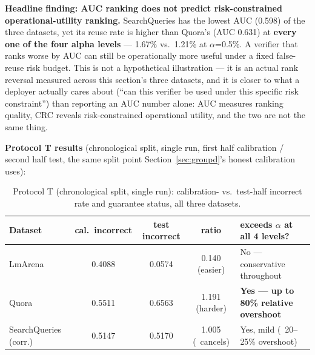 \documentclass[11pt]{article}
\newenvironment{fittab}{\begin{lrbox}{\fittabbox}}{\end{lrbox}%
  \ifdim\wd\fittabbox>\linewidth\resizebox{\linewidth}{!}{\usebox{\fittabbox}}\else\usebox{\fittabbox}\fi}
\begin{document}
\textbf{Headline finding: AUC ranking does not predict risk-constrained operational-utility ranking.} SearchQueries has the lowest AUC (0.598) of the three datasets, yet its reuse rate is higher than Quora's (AUC 0.631) at \textbf{every one of the four alpha levels} --- 1.67\% vs.\ 1.21\% at $\alpha$=0.5\%. A verifier that ranks worse by AUC can still be operationally more useful under a fixed false-reuse risk budget. This is not a hypothetical illustration --- it is an actual rank reversal measured across this section's three datasets, and it is closer to what a deployer actually cares about (``can this verifier be used under this specific risk constraint'') than reporting an AUC number alone: AUC measures ranking quality, CRC reveals risk-constrained operational utility, and the two are not the same thing.

\textbf{Protocol T results} (chronological split, single run, first half calibration / second half test, the same split point Section~\ref{sec:groupd}'s honest calibration uses):

\begin{table}[h]
\centering
\small
\begin{fittab}\begin{tabular}{@{}lcccl@{}}
\toprule
\textbf{Dataset} & \textbf{cal.\ incorrect} & \textbf{test incorrect} & \textbf{ratio} & \textbf{exceeds $\alpha$ at all 4 levels?} \\
\midrule
LmArena & 0.4088 & 0.0574 & 0.140 (easier) & No --- conservative throughout \\
Quora & 0.5511 & 0.6563 & 1.191 (harder) & \textbf{Yes --- up to 80\% relative overshoot} \\
SearchQueries (corr.) & 0.5147 & 0.5170 & 1.005 (~cancels) & Yes, mild (~20--25\% overshoot) \\
\bottomrule
\end{tabular}\end{fittab}
\caption{Protocol T (chronological split, single run): calibration- vs.\ test-half incorrect rate and guarantee status, all three datasets.}
\end{table}
\end{document}
